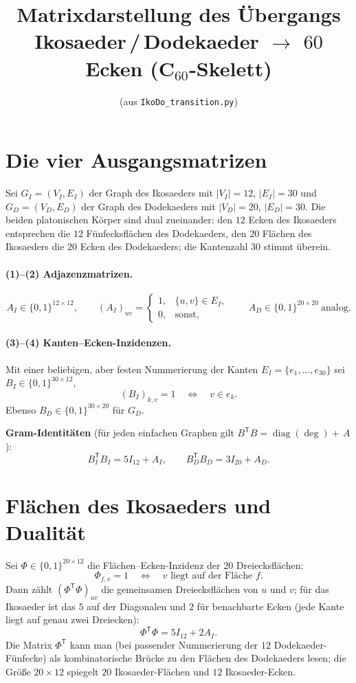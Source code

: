 \documentclass[11pt,a4paper]{article}
\title{Matrixdarstellung des Übergangs Ikosaeder\,/\,Dodekaeder $\to$ $60$ Ecken (C$_{60}$-Skelett)}
\author{(aus \texttt{IkoDo\_transition.py})}
\date{}
\begin{document}
\maketitle

\section{Die vier Ausgangsmatrizen}

Sei $G_I=(V_I,E_I)$ der Graph des Ikosaeders mit $|V_I|=12$, $|E_I|=30$ und
$G_D=(V_D,E_D)$ der Graph des Dodekaeders mit $|V_D|=20$, $|E_D|=30$.
Die beiden platonischen Körper sind dual zueinander: den $12$ Ecken des Ikosaeders
entsprechen die $12$ Fünfecksflächen des Dodekaeders, den $20$ Flächen des Ikosaeders
die $20$ Ecken des Dodekaeders; die Kantenzahl $30$ stimmt überein.

\paragraph{(1)--(2) Adjazenzmatrizen.}
\[
A_I \in \{0,1\}^{12\times 12},\qquad
(A_I)_{uv} =
\begin{cases}
1,& \{u,v\}\in E_I,\\
0,& \text{sonst},
\end{cases}
\qquad
A_D \in \{0,1\}^{20\times 20}\ \text{analog.}
\]

\paragraph{(3)--(4) Kanten--Ecken-Inzidenzen.}
Mit einer beliebigen, aber festen Nummerierung der Kanten $E_I=\{e_1,\dots,e_{30}\}$ sei
$B_I\in\{0,1\}^{30\times 12}$,
\[
(B_I)_{k,v}=1 \quad\Longleftrightarrow\quad v\in e_k .
\]
Ebenso $B_D\in\{0,1\}^{30\times 20}$ für $G_D$.

\medskip
\noindent
\textbf{Gram-Identitäten} (für jeden einfachen Graphen gilt
$B^{\mathsf T}B=\operatorname{diag}(\deg)+\,A$):
\begin{equation}
\label{eq:gram}
B_I^{\mathsf T}B_I = 5 I_{12} + A_I,
\qquad
B_D^{\mathsf T}B_D = 3 I_{20} + A_D.
\end{equation}

\section{Flächen des Ikosaeders und Dualität}

Sei $\Phi\in\{0,1\}^{20\times 12}$ die Flächen--Ecken-Inzidenz der $20$ Dreiecksflächen:
\[
\Phi_{f,v}=1 \quad\Longleftrightarrow\quad v \text{ liegt auf der Fläche } f .
\]
Dann zählt $(\Phi^{\mathsf T}\Phi)_{uv}$ die gemeinsamen Dreiecksflächen von $u$ und $v$;
für das Ikosaeder ist das $5$ auf der Diagonalen und $2$ für benachbarte Ecken (jede Kante
liegt auf genau zwei Dreiecken):
\begin{equation}
\label{eq:phi}
\Phi^{\mathsf T}\Phi = 5 I_{12} + 2 A_I .
\end{equation}
Die Matrix $\Phi^{\mathsf T}$ kann man (bei passender Nummerierung der $12$ Dodekaeder-Fünfecke)
als kombinatorische Brücke zu den Flächen des Dodekaeders lesen; die Größe $20\times 12$
spiegelt $20$ Ikosaeder-Flächen und $12$ Ikosaeder-Ecken.
\end{document}

